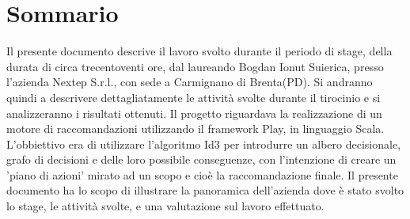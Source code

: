 
\cleardoublepage
{}
{}
\begingroup
\let\clearpage\relax
\let\cleardoublepage\relax
\let\cleardoublepage\relax

\chapter*{Sommario}

Il presente documento descrive il lavoro svolto durante il periodo di stage, della durata di circa trecentoventi ore, dal laureando Bogdan Ionut Suierica, presso l'azienda Nextep S.r.l., con sede a Carmignano di Brenta(PD). Si andranno quindi a descrivere dettagliatamente le attività svolte durante il tirocinio e si analizzeranno i risultati ottenuti. Il progetto riguardava la realizzazione di un motore di raccomandazioni utilizzando il framework Play, in linguaggio Scala. L'obbiettivo era di utilizzare l'algoritmo Id3 per introdurre un albero decisionale, grafo di decisioni e delle loro possibile conseguenze, con l'intenzione di creare un 'piano di azioni' mirato ad un scopo e cioè la raccomandazione finale.
Il presente documento ha lo scopo di illustrare la panoramica dell'azienda dove è stato svolto lo stage, le attività svolte, e una valutazione sul lavoro effettuato.

%
%

\endgroup			

\vfill

